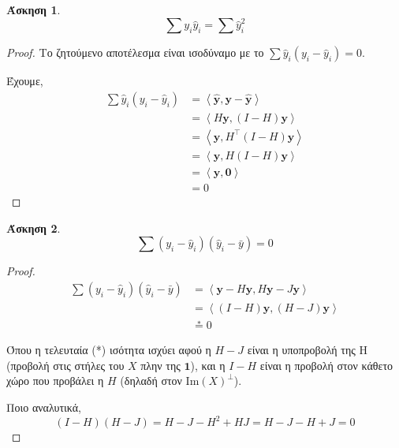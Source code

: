 \documentclass{article}
\newcommand{\inner}[2]{\left\langle #1 \mathrel{,} #2 \right\rangle}
\newcommand{\T}[1]{{#1}^{\top}}  %
\newcommand{\ve}[1]{\boldsymbol{#1}}
\newtheorem{exercise}{Άσκηση}[section]
\begin{document}
\begin{exercise}
    \begin{equation*}
        \sum y_i \hat{y}_i = \sum \hat{y}_i^2
    \end{equation*}
\end{exercise}
\begin{proof}
    Το ζητούμενο αποτέλεσμα είναι ισοδύναμο με το \(\sum \hat{y}_i (y_i - \hat{y}_i) = 0\).

    Έχουμε,
    \begin{equation*}
    \begin{split}
        \sum \hat{y}_i (y_i - \hat{y}_i) &= \inner{\ve{\hat{y}}}{\ve{y} - \ve{\hat{y}}}\\
        &= \inner{H \ve{y}}{(I-H) \ve{y}}\\
        &= \inner{\ve{y}}{\T{H}(I - H)\ve{y}}\\
        &= \inner{\ve{y}}{H(I - H)\ve{y}}\\
        &= \inner{\ve{y}}{\ve{0}}\\
        &= 0
    \end{split}
    \end{equation*}
\end{proof}


\begin{exercise}
    \begin{equation*}
        \sum \left( y_i - \hat{y}_i \right) \left(\hat{y}_i - \bar{y}\right) = 0
    \end{equation*}
\end{exercise}
\begin{proof}
    \begin{equation*}
    \begin{split}
        \sum \left( y_i - \hat{y}_i \right) \left(\hat{y}_i - \bar{y}\right) &= \inner{\ve{y} - H\ve{y}}{H\ve{y} - J\ve{y}}\\
        &= \inner{(I - H) \ve{y}}{(H - J) \ve{y}}\\
        &\stackrel{*}{=} 0
    \end{split}
    \end{equation*}

    Όπου η τελευταία (*) ισότητα ισχύει αφού η \(H - J\) είναι η υποπροβολή της H (προβολή στις στήλες του \(X\) πλην της \(\ve{1}\)),
    και η \(I - H\) είναι η προβολή στον κάθετο χώρο που προβάλει η \(H\) (δηλαδή στον \(\mathrm{Im}(X)^{\bot}\)).
    
    Ποιο αναλυτικά,
    \begin{equation*}
        \left( I - H \right) \left( H - J \right) =
        H - J - H^2 + HJ =
        H - J - H + J =
        0
    \end{equation*}
\end{proof}
\end{document}
